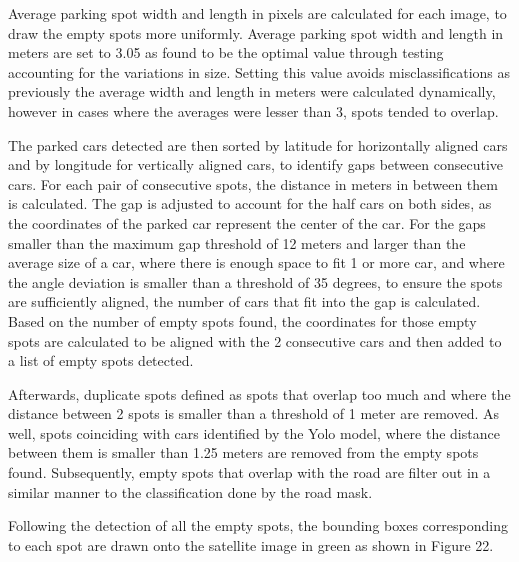 Average parking spot width and length in pixels are calculated for each image,
to draw the empty spots more uniformly. Average parking spot width and length in
meters are set to 3.05 as found to be the optimal value through testing
accounting for the variations in size. Setting this value avoids
misclassifications as previously the average width and length in meters were
calculated dynamically, however in cases where the averages were lesser than 3,
spots tended to overlap.

The parked cars detected are then sorted by latitude for horizontally aligned
cars and by longitude for vertically aligned cars, to identify gaps between
consecutive cars. For each pair of consecutive spots, the distance in meters in
between them is calculated. The gap is adjusted to account for the half cars on
both sides, as the coordinates of the parked car represent the center of the
car. For the gaps smaller than the maximum gap threshold of 12 meters and larger
than the average size of a car, where there is enough space to fit 1 or more
car, and where the angle deviation is smaller than a threshold of 35 degrees, to
ensure the spots are sufficiently aligned, the number of cars that fit into the
gap is calculated. Based on the number of empty spots found, the coordinates for
those empty spots are calculated to be aligned with the 2 consecutive cars and
then added to a list of empty spots detected.

Afterwards, duplicate spots defined as spots that overlap too much and where the
distance between 2 spots is smaller than a threshold of 1 meter are removed. As
well, spots coinciding with cars identified by the Yolo model, where the
distance between them is smaller than 1.25 meters are removed from the empty
spots found. Subsequently, empty spots that overlap with the road are filter out
in a similar manner to the classification done by the road mask.

Following the detection of all the empty spots, the bounding boxes corresponding
to each spot are drawn onto the satellite image in green as shown in
Figure 22.

